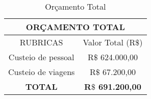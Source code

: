 \documentclass[10 pt]{article}
\begin{document}
 \begin{table}[h!]\label{tab orcamento}
  \begin{center}
   \begin{tabular}{|c|c|}
   \hline
   \multicolumn{2}{|c|}{{\bf ORÇAMENTO TOTAL}} \\
   \hline
   RUBRICAS &  Valor Total (R$\$$)\\
   \hline
   Custeio de pessoal &  R$\$$ 624.000,00 \\
   \hline
   Custeio de viagens &  R$\$$ 67.200,00 \\
   \hline
   {\bf TOTAL}&{\bf R$\$$ 691.200,00}\\
   \hline
   \end{tabular}
  \end{center}
  \caption{Orçamento Total}
 \end{table}
%
%
%
\end{document}
